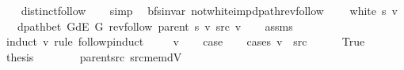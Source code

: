 \begin{isabellebody}
%
\isadelimproof
\ \ %
\endisadelimproof
%
\isatagproof
{}\isamarkupfalse%
\ distinct{\isacharunderscore}{\kern0pt}follow\isanewline
\ \ \isamarkupfalse%
\ simp%
\endisatagproof
{\isafoldproof}%
%
\isadelimproof
%
\endisadelimproof
%
\isadelimdocument
%
\endisadelimdocument
%
\isatagdocument
%
\isamarkuptrue%
%
\isamarkuptrue%
%
\isamarkuptrue%
%
\endisatagdocument
{\isafolddocument}%
%
\isadelimdocument
%
\endisadelimdocument
{}\isamarkupfalse%
\ {\isacharparenleft}{\kern0pt}\ bfs{\isacharunderscore}{\kern0pt}invar{\isacharparenright}{\kern0pt}\ not{\isacharunderscore}{\kern0pt}white{\isacharunderscore}{\kern0pt}imp{\isacharunderscore}{\kern0pt}dpath{\isacharunderscore}{\kern0pt}rev{\isacharunderscore}{\kern0pt}follow{\isacharcolon}{\kern0pt}\isanewline
\ \ \ {\isachardoublequoteopen}{\isasymnot}\ white\ s\ v{\isachardoublequoteclose}\isanewline
\ \ \ {\isachardoublequoteopen}dpath{\isacharunderscore}{\kern0pt}bet\ {\isacharparenleft}{\kern0pt}G{\isachardot}{\kern0pt}dE\ G{\isacharparenright}{\kern0pt}\ {\isacharparenleft}{\kern0pt}rev{\isacharunderscore}{\kern0pt}follow\ {\isacharparenleft}{\kern0pt}parent\ s{\isacharparenright}{\kern0pt}\ v{\isacharparenright}{\kern0pt}\ src\ v{\isachardoublequoteclose}\isanewline
%
\isadelimproof
\ \ %
\endisadelimproof
%
\isatagproof
{}\isamarkupfalse%
\ assms\isanewline
{}\isamarkupfalse%
\ {\isacharparenleft}{\kern0pt}induct\ v\ rule{\isacharcolon}{\kern0pt}\ follow{\isacharunderscore}{\kern0pt}pinduct{\isacharparenright}{\kern0pt}\isanewline
\ \ \isamarkupfalse%
\ {\isacharparenleft}{\kern0pt}{}\ v{\isacharparenright}{\kern0pt}\isanewline
\ \ \isamarkupfalse%
\ {\isacharquery}{\kern0pt}case\isanewline
\ \ \isamarkupfalse%
\ {\isacharparenleft}{\kern0pt}cases\ {\isachardoublequoteopen}v\ {\isacharequal}{\kern0pt}\ src{\isachardoublequoteclose}{\isacharparenright}{\kern0pt}\isanewline
\ \ \ \ \isamarkupfalse%
\ True\isanewline
\ \ \ \ \isamarkupfalse%
\ {\isacharquery}{\kern0pt}thesis\isanewline
\ \ \ \ \ \ \isamarkupfalse%
\ parent{\isacharunderscore}{\kern0pt}src\ src{\isacharunderscore}{\kern0pt}mem{\isacharunderscore}{\kern0pt}dV\isanewline
\ \ \ \ \ \ \isamarkupfalse%

\end{isabellebody}
